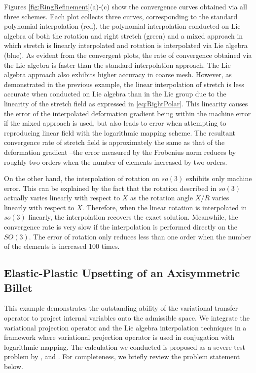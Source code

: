 \documentclass[12pt]{article}
\begin{document}
Figures \ref{fig:RingRefinement}(a)-(c) show the convergence curves
obtained via all three schemes.  Each plot collects three curves,
corresponding to the standard polynomial interpolation (red), the
polynomial interpolation conducted on Lie algebra of both the rotation
and right stretch (green) and a mixed approach in which stretch is
linearly interpolated and rotation is interpolated via Lie algebra
(blue).  As evident from the convergent plots, the rate of convergence
obtained via the Lie algebra is faster than the standard interpolation
approach. The Lie algebra approach also exhibits higher accuracy in
coarse mesh. However, as demonstrated in the previous example, the
linear interpolation of stretch is less accurate when conducted on Lie
algebra than in the Lie group due to the linearity of the stretch
field as expressed in \eqref{eq:RightPolar}. This linearity causes the
error of the interpolated deformation gradient being within the
machine error if the mixed approach is used, but also leads to error
when attempting to reproducing linear field with the logarithmic
mapping scheme. The resultant convergence rate of stretch field is
approximately the same as that of the deformation gradient --the error
measured by the Frobenius norm reduces by roughly two orders when the
number of elements increased by two orders.

On the other hand, the interpolation of rotation on $so(3)$ exhibits
only machine error. This can be explained by the fact that the
rotation described in $so(3)$ actually varies linearly with respect to
$X$ as the rotation angle $X/R$ varies linearly with respect to
$X$. Therefore, when the linear rotation is interpolated in $so(3)$
linearly, the interpolation recovers the exact solution. Meanwhile,
the convergence rate is very slow if the interpolation is performed
directly on the $SO(3)$. The error of rotation only reduces less than
one order when the number of the elements is increased 100 times.

\subsection{Elastic-Plastic Upsetting of an Axisymmetric Billet}
This example demonstrates the outstanding ability of the variational
transfer operator to project internal variables onto the admissible
space. We integrate the variational projection operator and the Lie
algebra interpolation techniques in a framework where variational
projection operator is used in conjugation with logarithmic mapping.
The calculation we conducted is proposed as a severe test problem by
\citet{Krieg.Krieg:1977}, \citet{Taylor.Becker:1983} and
\citet{Simo.Hughes:1998}. For completeness, we briefly review the
problem statement below.
\end{document}
